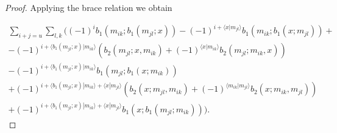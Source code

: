 \documentclass[twoside]{article}
\begin{document}
\begin{appendices}
\begin{proof}
Applying the brace relation we obtain

\begin{align}
\sum_{i+j=u}\sum_{l,k}((-1)^ib_1(m_{ik}; b_1(m_{jl};x))-(-1)^{i+\langle x|m_{jl}\rangle}b_1(m_{ik};b_1(x;m_{jl}))+\nonumber\\
 -(-1)^{i+\langle b_1(m_{jl};x)|m_{ik}\rangle}(b_2(m_{jl};x,m_{ik})+(-1)^{\langle x|m_{ik}\rangle}b_2(m_{jl};m_{ik},x))\nonumber\\
 -(-1)^{i+\langle b_1(m_{jl};x)|m_{ik}\rangle}b_1(m_{jl};b_1(x;m_{ik}))\label{twistedequation}\\
+(-1)^{i+\langle b_1(m_{jl};x)|m_{ik}\rangle+\langle x|m_{jl}\rangle}(b_2(x;m_{jl},m_{ik})+(-1)^{\langle m_{ik}|m_{jl}\rangle}b_2(x;m_{ik},m_{jl}))\nonumber\\
+(-1)^{i+\langle b_1(m_{jl};x)|m_{ik}\rangle+\langle x|m_{jl}\rangle}b_1(x;b_1(m_{jl};m_{ik}))).\nonumber
\end{align}


\end{proof}
\end{appendices}
\end{document}
